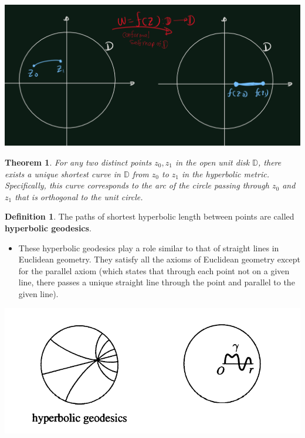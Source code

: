 \documentclass[
]{book}
\providecommand{\tightlist}{%
  \setlength{\itemsep}{0pt}\setlength{\parskip}{0pt}}
\newtheorem{theorem}{Theorem}[chapter]
\theoremstyle{definition}
\newtheorem{definition}{Definition}[chapter]
\theoremstyle{definition}
\theoremstyle{definition}
\theoremstyle{definition}
\theoremstyle{remark}
\begin{document}
\begin{center}\includegraphics[width=23.78in]{figures/Riemann_Mapping_Therom/fig2} \end{center}

\begin{theorem}
\protect\hypertarget{thm:unnamed-chunk-39}{}\label{thm:unnamed-chunk-39}For any two distinct points \(z_0, z_1\) in the open unit disk \(\mathbb{D}\), there exists a unique shortest curve in \(\mathbb{D}\) from \(z_0\) to \(z_1\) in the hyperbolic metric. Specifically, this curve corresponds to the arc of the circle passing through \(z_0\) and \(z_1\) that is orthogonal to the unit circle.
\end{theorem}

\begin{definition}
\protect\hypertarget{def:unnamed-chunk-40}{}\label{def:unnamed-chunk-40}The paths of shortest hyperbolic length between points are called \textbf{hyperbolic geodesics}.
\end{definition}

\begin{itemize}
\tightlist
\item
  These hyperbolic geodesics play a role similar to that of straight lines in Euclidean geometry. They satisfy all the axioms of Euclidean geometry except for the parallel axiom (which states that through each point not on a given line, there passes a unique straight line through the point and parallel to the given line).
\end{itemize}

\begin{center}\includegraphics[width=11.5in]{figures/Riemann_Mapping_Therom/fig3} \end{center}
\end{document}
